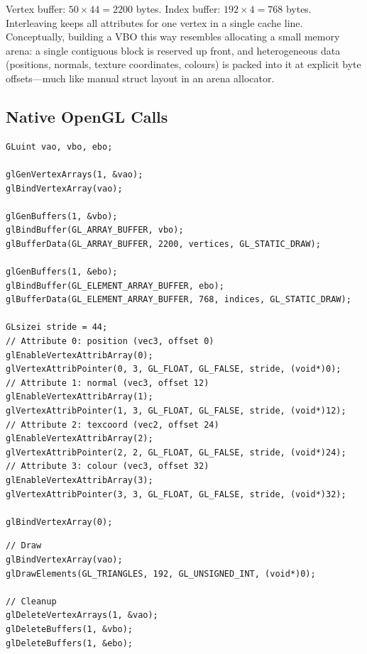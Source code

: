 \documentclass[11pt,a4paper]{article}
\begin{document}
\begin{center}
\small
{}
\end{center}

Vertex buffer: $50 \times 44 = 2200$ bytes.
Index buffer: $192 \times 4 = 768$ bytes.
Interleaving keeps all attributes for one vertex in a single cache line.
Conceptually, building a VBO this way resembles allocating a small memory arena:
a single contiguous block is reserved up front, and heterogeneous data
(positions, normals, texture coordinates, colours) is packed into it at
explicit byte offsets---much like manual struct layout in an arena allocator.

\subsection{Native OpenGL Calls}

\begin{lstlisting}[caption={VBO/VAO/EBO setup}]
GLuint vao, vbo, ebo;

glGenVertexArrays(1, &vao);
glBindVertexArray(vao);

glGenBuffers(1, &vbo);
glBindBuffer(GL_ARRAY_BUFFER, vbo);
glBufferData(GL_ARRAY_BUFFER, 2200, vertices, GL_STATIC_DRAW);

glGenBuffers(1, &ebo);
glBindBuffer(GL_ELEMENT_ARRAY_BUFFER, ebo);
glBufferData(GL_ELEMENT_ARRAY_BUFFER, 768, indices, GL_STATIC_DRAW);

GLsizei stride = 44;
// Attribute 0: position (vec3, offset 0)
glEnableVertexAttribArray(0);
glVertexAttribPointer(0, 3, GL_FLOAT, GL_FALSE, stride, (void*)0);
// Attribute 1: normal (vec3, offset 12)
glEnableVertexAttribArray(1);
glVertexAttribPointer(1, 3, GL_FLOAT, GL_FALSE, stride, (void*)12);
// Attribute 2: texcoord (vec2, offset 24)
glEnableVertexAttribArray(2);
glVertexAttribPointer(2, 2, GL_FLOAT, GL_FALSE, stride, (void*)24);
// Attribute 3: colour (vec3, offset 32)
glEnableVertexAttribArray(3);
glVertexAttribPointer(3, 3, GL_FLOAT, GL_FALSE, stride, (void*)32);

glBindVertexArray(0);
\end{lstlisting}

\begin{lstlisting}[caption={Render and cleanup}]
// Draw
glBindVertexArray(vao);
glDrawElements(GL_TRIANGLES, 192, GL_UNSIGNED_INT, (void*)0);

// Cleanup
glDeleteVertexArrays(1, &vao);
glDeleteBuffers(1, &vbo);
glDeleteBuffers(1, &ebo);
\end{lstlisting}


\nocite{*}
\printbibliography
\end{document}
